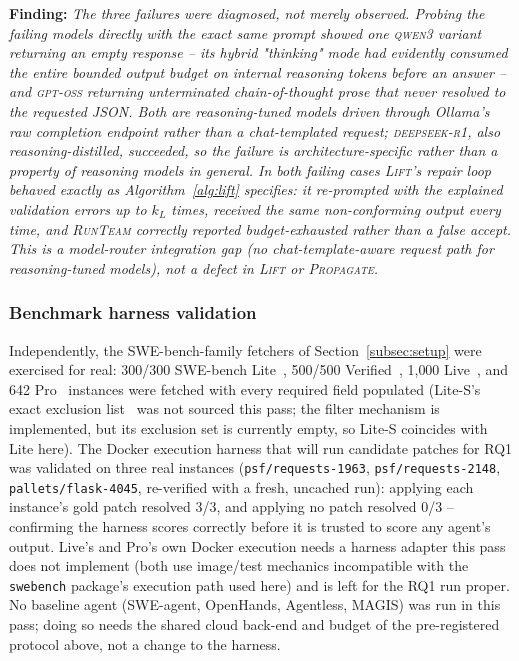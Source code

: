 \documentclass[10pt, anonymous, conference]{IEEEtran}
\theoremstyle{definition}
\theoremstyle{plain}
\theoremstyle{remark}
\newcommand{\finding}[1]{\smallskip\noindent\textbf{Finding:} \textit{#1}\smallskip}
\newcommand{\code}[1]{\texttt{#1}}
\begin{document}
\finding{The three failures were diagnosed, not merely observed. Probing the failing models directly with
the exact same prompt showed one \textsc{qwen3} variant returning an \emph{empty} response -- its hybrid
"thinking" mode had evidently consumed the entire bounded output budget on internal reasoning tokens before
an answer -- and \textsc{gpt-oss} returning unterminated chain-of-thought prose that never resolved to the
requested JSON. Both are reasoning-tuned models driven through Ollama's raw completion endpoint rather
than a chat-templated request; \textsc{deepseek-r1}, also reasoning-distilled, succeeded, so the failure is
architecture-specific rather than a property of reasoning models in general. In both failing cases
\textsc{Lift}'s repair loop behaved exactly as Algorithm~\ref{alg:lift} specifies: it re-prompted with the
explained validation errors up to $k_L$ times, received the same non-conforming output every time, and
\textsc{RunTeam} correctly reported budget-exhausted rather than a false accept. This is a model-router
integration gap (no chat-template-aware request path for reasoning-tuned models), not a defect in
\textsc{Lift} or \textsc{Propagate}.}

\subsubsection{Benchmark harness validation}
Independently, the SWE-bench-family fetchers of Section~\ref{subsec:setup} were exercised for real:
300/300 SWE-bench Lite~\cite{jimenez2024swebench}, 500/500 Verified~\cite{openai2024verified}, 1{,}000
Live~\cite{zhang2025swebenchlive}, and 642 Pro~\cite{deng2025swebenchpro} instances were fetched with every
required field populated (Lite-S's exact exclusion list~\cite{xia2025agentless} was not sourced this pass;
the filter mechanism is implemented, but its exclusion set is currently empty, so Lite-S coincides with
Lite here). The Docker execution harness that will run candidate patches for RQ1 was validated on three
real instances (\code{psf/requests-1963}, \code{psf/requests-2148}, \code{pallets/flask-4045}, re-verified
with a fresh, uncached run): applying each instance's gold patch resolved 3/3, and applying no patch
resolved 0/3 -- confirming the harness scores correctly before it is trusted to score any agent's output.
Live's and Pro's own Docker execution needs a harness adapter this pass does not implement (both use
image/test mechanics incompatible with the \texttt{swebench} package's execution path used here) and is
left for the RQ1 run proper. No baseline agent (SWE-agent, OpenHands, Agentless, MAGIS) was run in this
pass; doing so needs the shared cloud back-end and budget of the pre-registered protocol above, not a
change to the harness.
\end{document}

